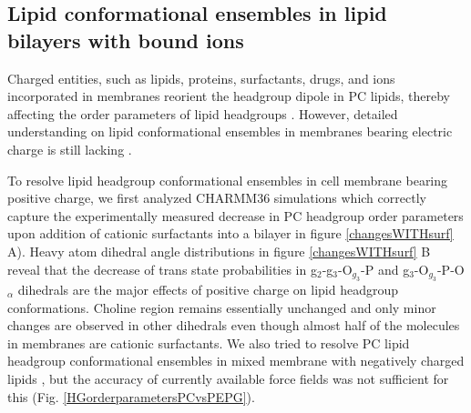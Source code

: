 \documentclass[aps,prl,superscriptaddress,twocolumn]{revtex4}
\begin{document}
\subsection{Lipid conformational ensembles in lipid bilayers with bound ions}

Charged entities, such as lipids, proteins, surfactants, drugs, and ions incorporated in membranes
reorient the headgroup dipole in PC lipids, thereby affecting the order parameters of
lipid headgroups \cite{seelig87}. However, detailed understanding on
lipid conformational ensembles in membranes bearing electric charge is still lacking \cite{Semchyschyn04}.

To resolve lipid headgroup conformational ensembles in cell membrane bearing positive charge, we first analyzed CHARMM36 simulations which correctly capture the experimentally measured decrease in PC headgroup order parameters upon addition of cationic surfactants into a bilayer in figure \ref{changesWITHsurf} A).
Heavy atom dihedral angle distributions in figure \ref{changesWITHsurf} B
reveal that the decrease of trans state probabilities in g$_2$-g$_3$-O$_{g_3}$-P and g$_3$-O$_{g_3}$-P-O$_\alpha$
dihedrals are the major effects of positive charge on lipid headgroup conformations.
Choline region remains essentially unchanged and only minor changes are observed in other dihedrals
even though almost half of the molecules in membranes are cationic surfactants.
We also tried to resolve PC lipid headgroup conformational ensembles in mixed membrane with
negatively charged lipids \cite{scherer87},
but the accuracy of currently available force fields
was not sufficient for this (Fig. \ref{HGorderparametersPCvsPEPG}).
\end{document}
